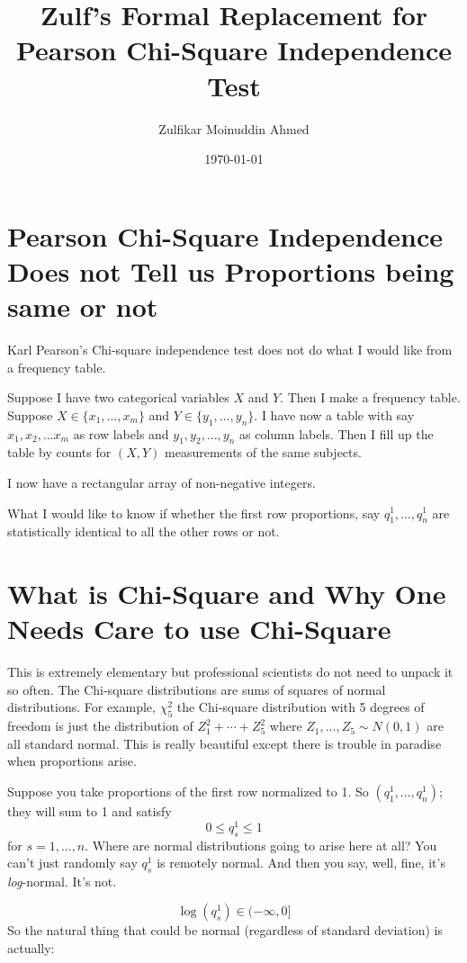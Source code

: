 \documentclass{amsart}
\title{Zulf's Formal Replacement for Pearson Chi-Square Independence Test}
\author{Zulfikar Moinuddin Ahmed}
\date{\today}
\begin{document}
\maketitle

\section{Pearson Chi-Square Independence Does not Tell us Proportions being same or not}

Karl Pearson's Chi-square independence test does not do what I would like from a frequency table.

Suppose I have two categorical variables $X$ and $Y$.  Then I make a frequency table.  Suppose $X \in \{ x_1, \dots, x_m\}$ and $Y \in \{ y_1, \dots, y_n \}$.  I have now a table with say $x_1, x_2 , \dots x_m$ as row labels and $y_1, y_2, \dots, y_n$ as column labels.  Then I fill up the table by counts for $(X,Y)$ measurements of the same subjects.

I now have a rectangular array of non-negative integers.  

What I would like to know if whether the first row proportions, say $q^1_1,\dots, q^1_n$ are statistically identical to all the other rows or not.

\section{What is Chi-Square and Why One Needs Care to use Chi-Square}

This is extremely elementary but professional scientists do not need to unpack it so often.  The Chi-square distributions are sums of squares of normal distributions.  For example, $\chi^2_5$ the Chi-square distribution with 5 degrees of freedom is just the distribution of $Z_1^2 + \cdots + Z_5^2$ where $Z_1,\dots, Z_5 \sim N(0,1)$ are all standard normal.  This is really beautiful except there is trouble in paradise when proportions arise. 

Suppose you take proportions of the first row normalized to 1.  So $(q^1_1,\dots, q^1_n)$; they will sum to 1 and satisfy 
\[
0 \le q^1_s \le 1
\]
for $s=1,\dots,n$.  Where are normal distributions going to arise here at all?  You can't just randomly say $q^1_s$ is remotely normal.  And then you say, well, fine, it's {\em log}-normal.  It's not.

\[
\log(q^1_s) \in (-\infty, 0]
\]
So the natural thing that could be normal (regardless of standard deviation) is actually:
\end{document}
